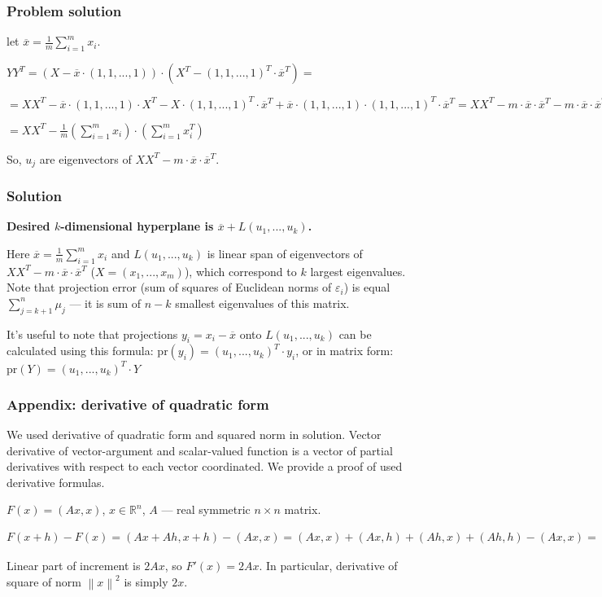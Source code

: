 \documentclass[10pt,pdf]{beamer}
\newcommand{\norm}[1]{\left\lVert#1\right\rVert}
\newcommand{\dotprod}[2]{\left(#1, #2\right)}
\begin{document}
    \begin{frame}
        \frametitle{Problem solution}
        let $\overline{x} = \frac{1}{m} \sum\limits_{i=1}^m x_i$.

        $Y Y^T = \left(X -  \overline{x}\cdot (1, 1, ..., 1)\right) \cdot
        \left(X^T - (1, 1, ..., 1)^T \cdot \overline{x}^T \right) = $

        $ = X X^T - \overline{x}\cdot (1, 1, ..., 1) \cdot X^T - 
        X \cdot (1, 1, ..., 1)^T \cdot \overline{x}^T + 
        \overline{x} \cdot (1, 1, ..., 1) \cdot (1, 1, ..., 1)^T \cdot \overline{x}^T
         = X X^T - m \cdot \overline{x} \cdot \overline{x}^T - m \cdot \overline{x} \cdot \overline{x}^T
         + m \cdot \overline{x} \cdot \overline{x}^T = X X^T - m \cdot \overline{x} \cdot \overline{x}^T= $

        $ = X X^T - \frac{1}{m} \left( \sum\limits_{i=1}^m x_i\right) \cdot \left( \sum\limits_{i=1}^m x_i^T\right)$

        So, $u_j$ are eigenvectors of
        $X X^T - m \cdot \overline{x} \cdot \overline{x}^T$.
    \end{frame}
    \begin{frame}
        \frametitle{Solution}
        \textbf{Desired $k$-dimensional hyperplane is $\overline{x} + L(u_1, ..., u_k)$.}

        Here
        $\overline{x} = \frac{1}{m} \sum\limits_{i=1}^m x_i$
        and $L(u_1, ..., u_k)$ is linear span of eigenvectors of
        $X X^T - m \cdot \overline{x} \cdot \overline{x}^T$ ($X = ({x_1}, ..., {x_m})$),
        which correspond to $k$ largest eigenvalues. 
        Note that projection error (sum of squares of Euclidean norms of $\varepsilon_i$)
        is equal ${\sum\limits_{j=k+1}^n \mu_j}$ --- it is sum of $n-k$ smallest eigenvalues of this matrix.

        It's useful to note that projections $y_i = x_i - \overline{x}$ onto $L(u_1, ..., u_k)$ can be calculated using this formula:
        $\mathrm{pr} (y_i) = (u_1, ..., u_k)^T \cdot y_i$, or in matrix form:
        $\mathrm{pr} (Y) = (u_1, ..., u_k)^T \cdot Y$
    \end{frame}
    \begin{frame}
        \frametitle{Appendix: derivative of quadratic form}
        We used derivative of quadratic form and squared norm in solution.
        Vector derivative of vector-argument and scalar-valued function is
        a vector of partial derivatives with respect to each vector coordinated.
        We provide a proof of used derivative formulas.

        $F(x) = \dotprod{Ax}{x}$, $x \in \mathbb{R}^n$, $A$ --- real symmetric $n\times n$ matrix.

        $F(x+h) - F(x) = \dotprod{Ax+Ah}{x+h} - \dotprod{Ax}{x} =
        \dotprod{Ax}{x} + \dotprod{Ax}{h} + \dotprod{Ah}{x} + \dotprod{Ah}{h} - \dotprod{Ax}{x} =
        \left[ A = A^T \right] = \dotprod{2Ax}{h} + \dotprod{Ah}{h}$

        Linear part of increment is $2Ax$, so $F'(x) = 2Ax$.
        In particular, derivative of square of norm $\norm{x}^2$ is simply $2x$.
    \end{frame}
\end{document}
